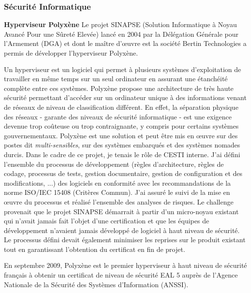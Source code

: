 \documentclass[a4paper,12pt]{article}
\begin{document}
\subsubsection{S\'ecurit\'e Informatique}
\textbf{Hyperviseur Polyx\`ene}
Le projet SINAPSE (Solution Informatique \`a Noyau Avanc\'e Pour une S\^uret\'e Elev\'ee) 
lanc\'e en 2004 par la D\'el\'egation G\'en\'erale pour l'Armement (DGA) et 
dont le ma\^itre d'\oe{}uvre est la soci\'et\'e Bertin Technologies a permis de d\'evelopper l'hyperviseur Polyx\`ene.

Un hyperviseur est un logiciel qui permet \`a plusieurs syst\`emes d'exploitation de travailler en
m\^eme temps sur un seul ordinateur en assurant une \'etanch\'eit\'e compl\`ete entre ces syst\`emes. 
Polyx\`ene propose une architecture de tr\`es haute s\'ecurit\'e
permettant d'acc\'eder sur un ordinateur unique \`a des informations venant de r\'eseaux de niveau de
classification diff\'erent. En effet, la s\'eparation physique des r\'eseaux - garante des niveaux de
s\'ecurit\'e informatique - est une exigence devenue trop co\^uteuse ou trop contraignante, y compris
pour certains syst\`emes gouvernementaux. Polyx\`ene est une solution et peut \^etre mis en \oe{}uvre sur des postes
dit \emph{multi-sensibles}, sur des syst\`emes embarqu\'es et des syst\`emes nomades durcis. 
Dans le cadre de ce projet, je tenais le r\^ole de CESTI interne. J'ai d\'efini l'ensemble du processus de d\'eveloppement (r\`egles d'architecture, r\`egles de codage, processus de tests, gestion documentaire, gestion de configuration et des modifications, ...) 
des logiciels en conformit\'e avec les recommandations de la norme ISO/IEC 15408 (Crit\`eres Commun). J'ai assur\'e le suivi
de la mise en \oe{}uvre du processus et r\'ealis\'e l'ensemble des analyses de risques.  
Le challenge provenait que le projet SINAPSE d\'emarrait \`a partir d'un micro-noyau existant qui n'avait jamais fait l'objet d'une
certification et que les \'equipes de d\'eveloppement n'avaient jamais d\'evelopp\'e de logiciel \`a haut niveau de s\'ecurit\'e. Le processus d\'efini devait \'egalement minimiser les reprises sur le produit existant tout en garantissant l'obtention du certificat 
en fin de projet.

En septembre 2009, Polyx\`ene est le premier hyperviseur \`a haut niveau de s\'ecurit\'e
fran\c{c}ais \`a obtenir un certificat de niveau de s\'ecurit\'e EAL 5 aupr\`es de l'Agence Nationale de la
S\'ecurit\'e des Syst\`emes d'Information (ANSSI).
\end{document}
